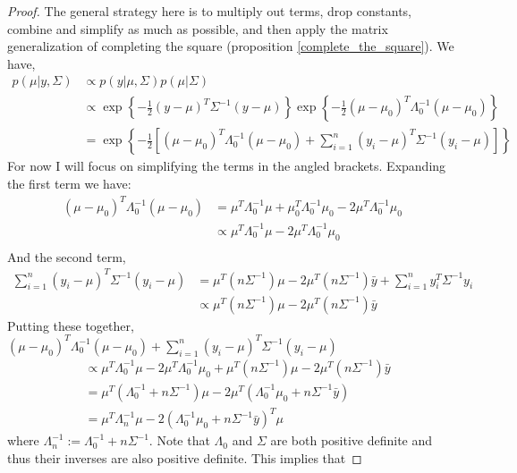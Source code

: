 \documentclass[12pt]{article}
\begin{document}
\begin{proof}
The general strategy here is to multiply out terms, drop constants, combine and simplify as much as possible, and then apply the matrix generalization of completing the square
(proposition \ref{complete_the_square}). We have, 
\begin{align*}
p(\mu|y, \Sigma) &\propto p(y|\mu, \Sigma)p(\mu|\Sigma) \\
			  &\propto \exp\left\{-\frac{1}{2}(y - \mu)^T \Sigma^{-1}(y - \mu)\right\} \exp\left\{-\frac{1}{2}(\mu - \mu_0)^T \Lambda_0^{-1}(\mu - \mu_0)\right\} \\ 
			  &= \exp\left\{-\frac{1}{2} \left[(\mu - \mu_0)^T \Lambda_0^{-1}(\mu - \mu_0) + \sum_{i = 1}^{n} (y_i - \mu)^T \Sigma^{-1}(y_i - \mu) \right]\right\}
\end{align*}
For now I will focus on simplifying the terms in the angled brackets. Expanding the first term we have:
\begin{align*}
(\mu - \mu_0)^T \Lambda_0^{-1}(\mu - \mu_0) &= \mu^T \Lambda_0^{-1} \mu + \mu_0^T \Lambda_0^{-1} \mu_0 - 2\mu^T \Lambda_0^{-1} \mu_0 \\
								       &\propto \mu^T \Lambda_0^{-1} \mu - 2\mu^T \Lambda_0^{-1} \mu_0 \\
\end{align*}
And the second term, 
\begin{align*}
\sum_{i = 1}^{n} (y_i - \mu)^T \Sigma^{-1}(y_i - \mu) &= \mu^T (n\Sigma^{-1})\mu - 2\mu^T(n\Sigma^{-1})\bar{y} + \sum_{i = 1}^{n} y_i^T \Sigma^{-1} y_i \\
									       &\propto \mu^T (n\Sigma^{-1})\mu - 2\mu^T(n\Sigma^{-1})\bar{y} 
\end{align*}
Putting these together, $(\mu - \mu_0)^T \Lambda_0^{-1}(\mu - \mu_0) + \sum_{i = 1}^{n} (y_i - \mu)^T \Sigma^{-1}(y_i - \mu)$
\begin{align*}
 &\propto \mu^T \Lambda_0^{-1} \mu - 2\mu^T \Lambda_0^{-1} \mu_0 + \mu^T (n\Sigma^{-1})\mu - 2\mu^T(n\Sigma^{-1})\bar{y}  \\
																			 &= \mu^T (\Lambda_0^{-1} + n\Sigma^{-1}) \mu - 2\mu^T(\Lambda_0^{-1} \mu_0 + n\Sigma^{-1} \bar{y}) \\
																			 &= \mu^T \Lambda_n^{-1 }\mu - 2(\Lambda_0^{-1} \mu_0 + n\Sigma^{-1} \bar{y})^T \mu
\end{align*}
where $\Lambda_n^{-1} := \Lambda_0^{-1} + n\Sigma^{-1}$. Note that $\Lambda_0$ and $\Sigma$ are both positive definite and thus their inverses are also positive definite. This implies that 

\end{proof}
\end{document}
